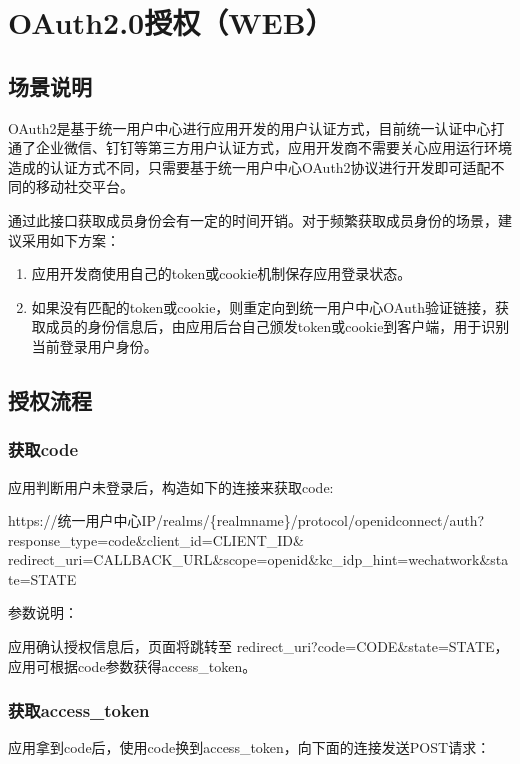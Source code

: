 \documentclass[a4paper,11pt,english]{sphinxmanual}
\begin{document}
\section{OAuth2.0授权（WEB）}
\label{\detokenize{auth:oauth2-0-web}}

\subsection{场景说明}
\label{\detokenize{auth:id2}}
OAuth2是基于统一用户中心进行应用开发的用户认证方式，目前统一认证中心打通了企业微信、钉钉等第三方用户认证方式，应用开发商不需要关心应用运行环境造成的认证方式不同，只需要基于统一用户中心OAuth2协议进行开发即可适配不同的移动社交平台。

通过此接口获取成员身份会有一定的时间开销。对于频繁获取成员身份的场景，建议采用如下方案：
\begin{enumerate}
%
\item {} 
应用开发商使用自己的token或cookie机制保存应用登录状态。

\item {} 
如果没有匹配的token或cookie，则重定向到统一用户中心OAuth验证链接，获取成员的身份信息后，由应用后台自己颁发token或cookie到客户端，用于识别当前登录用户身份。

\end{enumerate}


\subsection{授权流程}
\label{\detokenize{auth:id3}}

\subsubsection{获取code}
\label{\detokenize{auth:code}}
应用判断用户未登录后，构造如下的连接来获取code:

https://统一用户中心IP/realms/\{realm\sphinxhyphen{}name\}/protocol/openid\sphinxhyphen{}connect/auth?response\_type=code\&client\_id=CLIENT\_ID\&
redirect\_uri=CALLBACK\_URL\&scope=openid\&kc\_idp\_hint=wechat\sphinxhyphen{}work\&state=STATE

参数说明：



应用确认授权信息后，页面将跳转至 redirect\_uri?code=CODE\&state=STATE，应用可根据code参数获得access\_token。


\subsubsection{获取access\_token}
\label{\detokenize{auth:access-token}}
应用拿到code后，使用code换到access\_token，向下面的连接发送POST请求：
\end{document}

